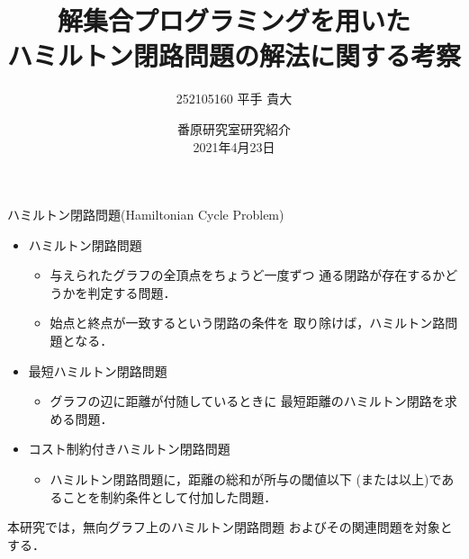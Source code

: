 \documentclass[dvipdfmx,10pt]{beamer}
\title{解集合プログラミングを用いた\\ハミルトン閉路問題の解法に関する考察}
\author{252105160 平手 貴大}
\date{番原研究室研究紹介\\2021年4月23日}
\begin{document}

\frame{\maketitle}

\begin{frame}{ハミルトン閉路問題(Hamiltonian Cycle Problem)}
  \begin{itemize}
  \item \alert{ハミルトン閉路問題}
    \begin{itemize}
    \item 与えられたグラフの全頂点をちょうど一度ずつ
      通る閉路が存在するかどうかを判定する問題．
    \item 始点と終点が一致するという閉路の条件を
      取り除けば，ハミルトン路問題となる．
    \end{itemize}
  \item \alert{最短ハミルトン閉路問題}
    \begin{itemize}
    \item グラフの辺に距離が付随しているときに
      最短距離のハミルトン閉路を求める問題．
    \end{itemize}
  \item \alert{コスト制約付きハミルトン閉路問題}
    \begin{itemize}
    \item ハミルトン閉路問題に，距離の総和が所与の閾値以下
      (または以上)であることを制約条件として付加した問題．
    \end{itemize}
  \end{itemize}
  \begin{alertblock}{}
    本研究では，無向グラフ上のハミルトン閉路問題
    およびその関連問題を対象とする．    
  \end{alertblock}
\end{frame}
\end{document}
